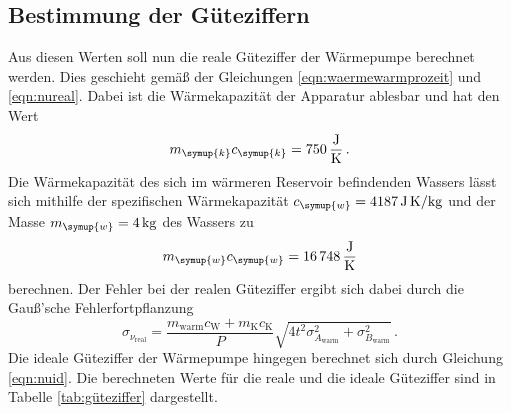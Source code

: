 
\subsection{Bestimmung der Güteziffern}

Aus diesen Werten soll nun die reale Güteziffer der Wärmepumpe berechnet werden. Dies geschieht gemäß der Gleichungen
\ref{eqn:waermewarmprozeit} und \ref{eqn:nureal}. Dabei ist die Wärmekapazität
der Apparatur ablesbar und hat den Wert
\begin{equation}
  m_{\symup{k}}c_{\symup{k}}=\SI{750}{\joule\per\kelvin} \,. \nonumber
\end{equation}
Die Wärmekapazität des sich im wärmeren Reservoir befindenden Wassers lässt sich
mithilfe der spezifischen Wärmekapazität $c_{\symup{w}}=\SI{4187}{\joule\per\kilo\gram\kelvin}$ \cite{waermewasser}
und der Masse $m_{\symup{w}}=\SI{4}{\kilo\gram}$ des Wassers zu
\begin{equation}
  m_{\symup{w}}c_{\symup{w}}=\SI{16748}{\joule\per\kelvin}  \nonumber
\end{equation}
berechnen.
Der Fehler bei der realen Güteziffer ergibt sich dabei durch die Gauß'sche Fehlerfortpflanzung
\begin{equation}
  \sigma_{\nu_\text{real}} = \frac{m_\text{warm} c_\text{W} + m_\text{K} c_\text{K}}{P}
  \sqrt{4 t^2 \sigma_{A_\text{warm}}^2 + \sigma_{B_\text{warm}}^2} \,.
\end{equation}
Die ideale Güteziffer der Wärmepumpe hingegen berechnet sich durch Gleichung
\ref{eqn:nuid}. Die berechneten Werte für die reale und die ideale Güteziffer
sind in Tabelle \ref{tab:güteziffer} dargestellt.

